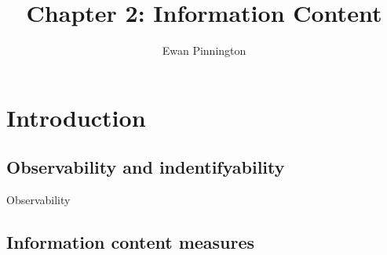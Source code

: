 \documentclass[11pt]{article}
\title{Chapter 2: Information Content}
\author{Ewan Pinnington}
\begin{document}
\maketitle

\section{Introduction}

\subsection{Observability and indentifyability}

Observability

\subsection{Information content measures}


{}
\end{document}
